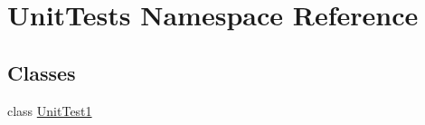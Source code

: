 \hypertarget{namespace_unit_tests}{}\section{Unit\+Tests Namespace Reference}
\label{namespace_unit_tests}
\subsection*{Classes}
\begin{DoxyCompactItemize}
\item 
class \hyperlink{class_unit_tests_1_1_unit_test1}{Unit\+Test1}
\end{DoxyCompactItemize}
